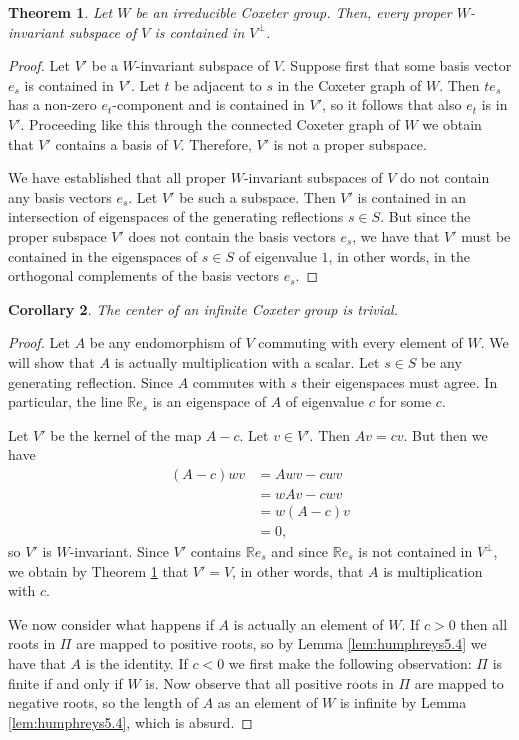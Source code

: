 \documentclass{article}
\newtheorem{theorem}{Theorem}[section]
\newtheorem{corollary}[theorem]{Corollary}
\theoremstyle{definition}
\begin{document}
\begin{theorem}\label{thm:invariant-subspaces}
Let $W$ be an irreducible Coxeter group. Then, every proper $W$-invariant subspace of $V$ is contained in $V^\perp$.
\end{theorem}

\begin{proof}
Let $V'$ be a $W$-invariant subspace of $V$. Suppose first that some basis vector $e_s$ is contained in $V'$. Let $t$ be adjacent to $s$ in the Coxeter graph of $W$. Then $te_s$ has a non-zero $e_t$-component and is contained in $V'$, so it follows that also $e_t$ is in $V'$. Proceeding like this through the connected Coxeter graph of $W$ we obtain that $V'$ contains a basis of $V$. Therefore, $V'$ is not a proper subspace.

We have established that all proper $W$-invariant subspaces of $V$ do not contain any basis vectors $e_s$. Let $V'$ be such a subspace. Then $V'$ is contained in an intersection of eigenspaces of the generating reflections $s \in S$. But since the proper subspace $V'$ does not contain the basis vectors $e_s$, we have that $V'$ must be contained in the eigenspaces of $s \in S$ of eigenvalue $1$, in other words, in the orthogonal complements of the basis vectors $e_s$.
\end{proof}

\begin{corollary}
The center of an infinite Coxeter group is trivial.
\end{corollary}

\begin{proof}
Let $A$ be any endomorphism of $V$ commuting with every element of $W$. We will show that $A$ is actually multiplication with a scalar. Let $s \in S$ be any generating reflection. Since $A$ commutes with $s$ their eigenspaces must agree. In particular, the line $\mathbb{R}e_s$ is an eigenspace of $A$ of eigenvalue $c$ for some $c$. 

Let $V'$ be the kernel of the map $A-c$. Let $v \in V'$. Then $Av = cv$. But then we have
\begin{align*}
(A-c)wv & = Awv - cwv \\
& = wAv - cwv \\
& = w(A - c) v \\
& = 0,
\end{align*}
so $V'$ is $W$-invariant. Since $V'$ contains $\mathbb{R}e_s$ and since $\mathbb{R}e_s$ is not contained in $V^\perp$, we obtain by Theorem \ref{thm:invariant-subspaces} that $V' = V$, in other words, that $A$ is multiplication with $c$.

We now consider what happens if $A$ is actually an element of $W$. If $c > 0$ then all roots in $\Pi$ are mapped to positive roots, so by Lemma \ref{lem:humphreys5.4} we have that $A$ is the identity. If $c < 0$ we first make the following observation: $\Pi$ is finite if and only if $W$ is. Now observe that all positive roots in $\Pi$ are mapped to negative roots, so the length of $A$ as an element of $W$ is infinite by Lemma \ref{lem:humphreys5.4}, which is absurd.
\end{proof}
\end{document}

